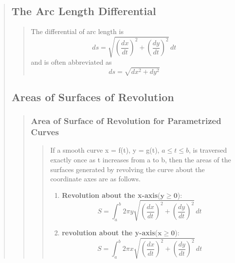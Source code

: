 \documentclass{report}
\begin{document}
\begin{quote}
	\subsection{The Arc Length Differential	}
	\begin{quote}
		
		The differential of arc length is
		$$ds = \sqrt{\left (\frac{dx}{dt}\right )^2 + \left(\frac{dy}{dt}\right )^2}\,dt$$
		and is often abbreviated as
		$$ds = \sqrt{dx^2+dy^2}$$

	\end{quote}

	\subsection{Areas of Surfaces of Revolution}
	\begin{quote}
		\subsubsection{Area of Surface of Revolution for Parametrized Curves}
		\begin{quote}

			If a smooth curve x = ƒ(t), y = g(t), $a\leq t\leq b$, is traversed exactly once as t increases from a to b, then the areas of the surfaces generated by revolving the curve about the coordinate axes are as follows.
			\begin{enumerate}
				\item {\textbf{Revolution about the x-axis}($\mathbf{y\geq 0}$):} $$S = \int_a^b 2\pi y \sqrt{\left (\frac{dx}{dt}\right )^2 + \left(\frac{dy}{dt}\right )^2}\,dt$$
				\item {\textbf{revolution about the y-axis}($\mathbf{x\geq 0}$):} $$S = \int_a^b 2\pi x \sqrt{\left (\frac{dx}{dt}\right )^2 + \left(\frac{dy}{dt}\right )^2}\,dt$$
			\end{enumerate}

		\end{quote}
	\end{quote}

\end{quote}

\end{document}
